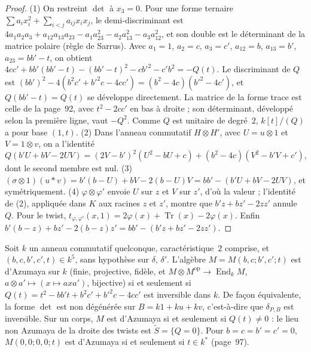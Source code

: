 \begin{proof}
(1) On restreint $\det$ à $x_3 = 0$. Pour une forme ternaire $\sum a_ix_i^2 + \sum_{i<j} a_{ij}x_ix_j$, le demi-discriminant est $4a_1a_2a_3 + a_{12}a_{13}a_{23} - a_1a_{23}^2 - a_2a_{13}^2 - a_3a_{12}^2$, et son double est le déterminant de la matrice polaire (règle de Sarrus). Avec $a_1 = 1$, $a_2 = c$, $a_3 = c'$, $a_{12} = b$, $a_{13} = b'$, $a_{23} = bb' - t$, on obtient $4cc' + bb'(bb' - t) - (bb' - t)^2 - cb'^2 - c'b^2 = -Q(t)$. Le discriminant de $Q$ est $(bb')^2 - 4(b^2c' + b'^2c - 4cc') = (b^2 - 4c)(b'^2 - 4c')$, et $Q(bb' - t) = Q(t)$ se développe directement. La matrice de la forme trace est celle de la page~92, avec $t^2 - 2cc'$ en bas à droite ; son déterminant, développé selon la première ligne, vaut $-Q^2$. Comme $Q$ est unitaire de degré~$2$, $k[t]/(Q)$ a pour base $(1, t)$. (2) Dans l'anneau commutatif $H \otimes H'$, avec $U = u \otimes 1$ et $V = 1 \otimes v$, on a l'identité
\[ Q(b'U + bV - 2UV) = (2V - b')^2(U^2 - bU + c) + (b^2 - 4c)(V^2 - b'V + c'), \]
dont le second membre est nul. (3) $(\sigma \otimes 1)(u * v) = b'(b - U) + bV - 2(b - U)V = bb' - (b'U + bV - 2UV)$, et symétriquement. (4) $\varphi \otimes \varphi'$ envoie $U$ sur $z$ et $V$ sur $z'$, d'où la valeur ; l'identité de (2), appliquée dans $K$ aux racines $z$ et $z'$, montre que $b'z + bz' - 2zz'$ annule $Q$. Pour le twist, $t_{\varphi,\varphi'}(x, 1) = 2\varphi(x) + \operatorname{Tr}(x) - 2\varphi(x)$. Enfin $b'(b - z) + bz' - 2(b - z)z' = bb' - (b'z + bz' - 2zz')$.
\end{proof}

\begin{enonce}
Soit $k$ un anneau commutatif quelconque, caractéristique~$2$ comprise, et $(b, c, b', c', t) \in k^5$, sans hypothèse sur $\delta$, $\delta'$. L'algèbre $M = M(b, c; b', c'; t)$ est d'Azumaya sur $k$ (finie, projective, fidèle, et $M \otimes M^{\mathrm{op}} \to \operatorname{End}_k M$, $a \otimes a' \mapsto (x \mapsto axa')$, bijective) si et seulement si $Q(t) = t^2 - bb't + b^2c' + b'^2c - 4cc'$ est inversible dans $k$. De façon équivalente, la forme $\det$ est non dégénérée sur $B = k1 + ku + kv$, c'est-à-dire que $\delta_{P,B}$ est inversible. Sur un corps, $M$ est d'Azumaya si et seulement si $Q(t) \neq 0$ : le lieu non Azumaya de la droite des twists est $\widetilde S = \{Q = 0\}$. Pour $b = c = b' = c' = 0$, $M(0, 0; 0, 0; t)$ est d'Azumaya si et seulement si $t \in k^{*}$ (page~97).
\end{enonce}

